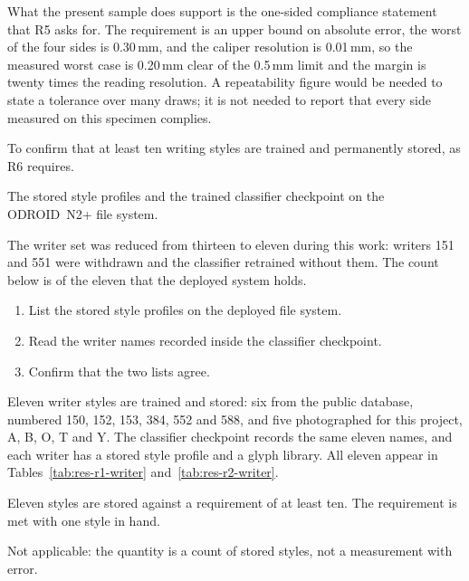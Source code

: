         What the present sample does support is the one-sided compliance
        statement that R5 asks for. The requirement is an upper bound on
        absolute error, the worst of the four sides is 0.30\,mm, and the
        caliper resolution is 0.01\,mm, so the measured worst case is 0.20\,mm
        clear of the 0.5\,mm limit and the margin is twenty times the reading
        resolution. A repeatability figure would be needed to state a tolerance
        over many draws; it is not needed to report that every side measured on
        this specimen complies.

\medskip

        \medskip

        To confirm that at least ten writing styles are trained and permanently
        stored, as R6 requires.

        \medskip

        The stored style profiles and the trained classifier checkpoint on the
        ODROID~N2+ file system.

        \medskip

        The writer set was reduced from thirteen to eleven during this work:
        writers 151 and 551 were withdrawn and the classifier retrained without
        them. The count below is of the eleven that the deployed system holds.

        \medskip

        \begin{enumerate}
        \item List the stored style profiles on the deployed file system.
        \item Read the writer names recorded inside the classifier checkpoint.
        \item Confirm that the two lists agree.
        \end{enumerate}

        \medskip

        Eleven writer styles are trained and stored: six from the public
        database, numbered 150, 152, 153, 384, 552 and 588, and five
        photographed for this project, A, B, O, T and Y. The classifier
        checkpoint records the same eleven names, and each writer has a stored
        style profile and a glyph library. All eleven appear in
        Tables~\ref{tab:res-r1-writer} and~\ref{tab:res-r2-writer}.

        \medskip

        Eleven styles are stored against a requirement of at least ten. The
        requirement is met with one style in hand.

        \medskip

        Not applicable: the quantity is a count of stored styles, not a
        measurement with error.
